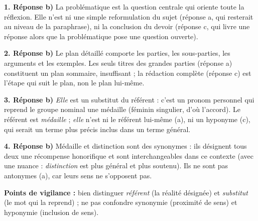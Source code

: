 \documentclass[11pt]{article}
\newcommand{\cle}[1]{{\popxbold\color{popdark}#1}}
\begin{document}
\begin{corrige}
\textbf{1. Réponse b)} La problématique est la \cle{question centrale} qui oriente toute la réflexion. Elle n'est ni une simple reformulation du sujet (réponse a, qui resterait au niveau de la paraphrase), ni la conclusion du devoir (réponse c, qui livre une réponse alors que la problématique pose une question ouverte).

\textbf{2. Réponse b)} Le plan détaillé comporte les \cle{parties}, les \cle{sous-parties}, les \cle{arguments} et les \cle{exemples}. Les seuls titres des grandes parties (réponse a) constituent un plan sommaire, insuffisant ; la rédaction complète (réponse c) est l'étape qui suit le plan, non le plan lui-même.

\textbf{3. Réponse b)} \emph{Elle} est un \cle{substitut} du référent : c'est un pronom personnel qui reprend le groupe nominal \og une médaille \fg{} (féminin singulier, d'où l'accord). Le référent est \emph{médaille} ; \emph{elle} n'est ni le référent lui-même (a), ni un hyponyme (c), qui serait un terme plus précis inclus dans un terme général.

\textbf{4. Réponse b)} \og Médaille \fg{} et \og distinction \fg{} sont des \cle{synonymes} : ils désignent tous deux une récompense honorifique et sont interchangeables dans ce contexte (avec une nuance : \emph{distinction} est plus général et plus soutenu). Ils ne sont pas antonymes (a), car leurs sens ne s'opposent pas.

\textbf{Points de vigilance :} bien distinguer \emph{référent} (la réalité désignée) et \emph{substitut} (le mot qui la reprend) ; ne pas confondre synonymie (proximité de sens) et hyponymie (inclusion de sens).
\end{corrige}
\end{document}
